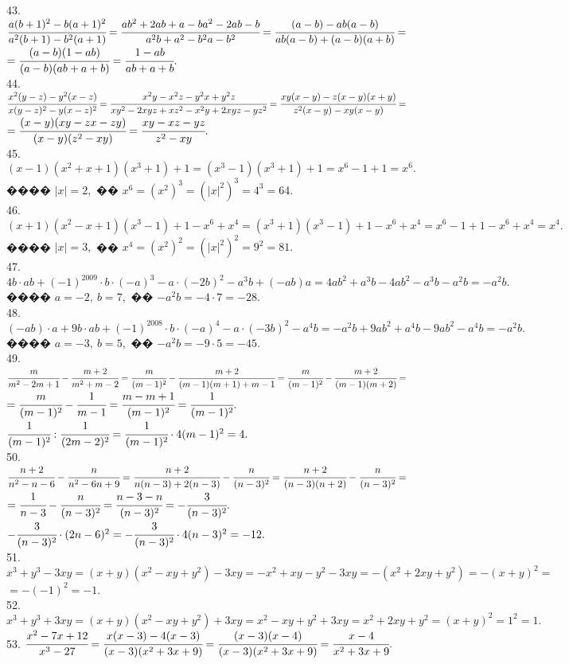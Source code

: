 \documentclass[12pt]{article}
\begin{document}
43. $\cfrac{a(b+1)^2-b(a+1)^2}{a^2(b+1)-b^2(a+1)}=\cfrac{ab^2+2ab+a-ba^2-2ab-b}{a^2b+a^2-b^2a-b^2}=\cfrac{(a-b)-ab(a-b)}{ab(a-b)+(a-b)(a+b)}=$\\$=
\cfrac{(a-b)(1-ab)}{(a-b)(ab+a+b)}=\cfrac{1-ab}{ab+a+b}.$\\
44. $\cfrac{x^2(y-z)-y^2(x-z)}{x(y-z)^2-y(x-z)^2}=\cfrac{x^2y-x^2z-y^2x+y^2z}{xy^2-2xyz+xz^2-x^2y+2xyz-yz^2}=
\cfrac{xy(x-y)-z(x-y)(x+y)}{z^2(x-y)-xy(x-y)}=$\\$=\cfrac{(x-y)(xy-zx-zy)}{(x-y)(z^2-xy)}=\cfrac{xy-xz-yz}{z^2-xy}.$\\
45. $(x-1)(x^2+x+1)(x^3+1)+1=(x^3-1)(x^3+1)+1=x^6-1+1=x^6.$ ���� $|x|=2,$ �� $x^6=(x^2)^3=(|x|^2)^3=4^3=64.$\\
46. $(x+1)(x^2-x+1)(x^3-1)+1-x^6+x^4=(x^3+1)(x^3-1)+1-x^6+x^4=x^6-1+1-x^6+x^4=x^4.$ ���� $|x|=3,$ �� $x^4=(x^2)^2=(|x|^2)^2=9^2=81.$\\
47. $4b\cdot ab+(-1)^{2009}\cdot b\cdot(-a)^3-a\cdot(-2b)^2-a^3b+(-ab)a=4ab^2+a^3b-4ab^2-a^3b-a^2b=-a^2b.$ ���� $a=-2,\ b=7,$ ��
$-a^2b=-4\cdot7=-28.$\\
48. $(-ab)\cdot a+9b\cdot ab+(-1)^{2008}\cdot b\cdot(-a)^4-a\cdot (-3b)^2-a^4b=-a^2b+9ab^2+a^4b-9ab^2-a^4b=-a^2b.$ ���� $a=-3,\ b=5,$ ��
$-a^2b=-9\cdot5=-45.$\\
49. $\cfrac{m}{m^2-2m+1}-\cfrac{m+2}{m^2+m-2}=\cfrac{m}{(m-1)^2}-\cfrac{m+2}{(m-1)(m+1)+m-1}=
\cfrac{m}{(m-1)^2}-\cfrac{m+2}{(m-1)(m+2)}=$\\$=\cfrac{m}{(m-1)^2}-\cfrac{1}{m-1}=\cfrac{m-m+1}{(m-1)^2}=\cfrac{1}{(m-1)^2}.$\\
$\cfrac{1}{(m-1)^2}:\cfrac{1}{(2m-2)^2}=\cfrac{1}{(m-1)^2}\cdot4(m-1)^2=4.$\\
50. $\cfrac{n+2}{n^2-n-6}-\cfrac{n}{n^2-6n+9}=\cfrac{n+2}{n(n-3)+2(n-3)}-\cfrac{n}{(n-3)^2}=\cfrac{n+2}{(n-3)(n+2)}-\cfrac{n}{(n-3)^2}=$\\
$=\cfrac{1}{n-3}-\cfrac{n}{(n-3)^2}=\cfrac{n-3-n}{(n-3)^2}=-\cfrac{3}{(n-3)^2}.$\\
$-\cfrac{3}{(n-3)^2}\cdot(2n-6)^2=-\cfrac{3}{(n-3)^2}\cdot4(n-3)^2=-12.$\\
51. $x^3+y^3-3xy=(x+y)(x^2-xy+y^2)-3xy=-x^2+xy-y^2-3xy=-(x^2+2xy+y^2)=-(x+y)^2=$\\$=-(-1)^2=-1.$\\
52. $x^3+y^3+3xy=(x+y)(x^2-xy+y^2)+3xy=x^2-xy+y^2+3xy=x^2+2xy+y^2=(x+y)^2=1^2=1.$\\
53. $\cfrac{x^2-7x+12}{x^3-27}=\cfrac{x(x-3)-4(x-3)}{(x-3)(x^2+3x+9)}=\cfrac{(x-3)(x-4)}{(x-3)(x^2+3x+9)}=\cfrac{x-4}{x^2+3x+9}.$\\
\end{document}
